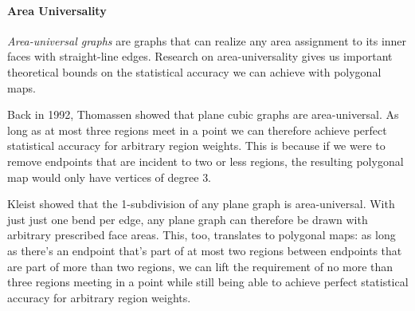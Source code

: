 \paragraph{Area Universality}

\emph{Area-universal graphs} are graphs that can realize any area assignment to its inner faces with straight-line edges. Research on area-universality gives us important theoretical bounds on the statistical accuracy we can achieve with polygonal maps.

Back in 1992, Thomassen \cite{thomassen1992plane} showed that plane cubic graphs are area-universal. As long as at most three regions meet in a point we can therefore achieve perfect statistical accuracy for arbitrary region weights. This is because if we were to remove endpoints that are incident to two or less regions, the resulting polygonal map would only have vertices of degree 3.

Kleist \cite{kleist2018drawing} \cite{kleist2019planar} showed that the 1-subdivision of any plane graph is area-universal. With just just one bend per edge, any plane graph can therefore be drawn with arbitrary prescribed face areas. This, too, translates to polygonal maps: as long as there's an endpoint that's part of at most two regions between endpoints that are part of more than two regions, we can lift the requirement of no more than three regions meeting in a point while still being able to achieve perfect statistical accuracy for arbitrary region weights.
